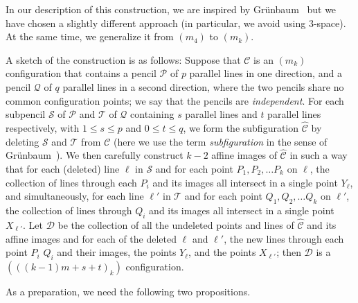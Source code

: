 \documentclass[reqno,12pt]{amsart}
\theoremstyle{plain}
\theoremstyle{definition}
\theoremstyle{remark}
\newcommand{\mc}[1]{\mathcal{#1}}
\begin{document}
In our description of this construction, we are inspired by Gr\"unbaum~\cite[\S 3.3, pp. 177--180]{Gru2009b} but we have chosen 
a slightly different approach (in particular, we avoid using 3-space). At the same time, we generalize it from $(m_4)$ to $(m_k)$.

A sketch of the construction is as follows: Suppose that $\mc{C}$ is an $(m_{k})$ configuration that contains a pencil $\mc{P}$ of 
$p$ parallel lines in one direction, and a pencil $\mc{Q}$ of $q$ parallel lines in a second direction, where the two pencils share 
no common configuration points; we say that the pencils are \emph{independent}. For each subpencil $\mc S$ of $\mc P$  and 
$\mc{T}$ of $\mc{Q}$ containing $s$ parallel lines and $t$ parallel lines respectively, with $1 \leq s \leq p$ and $0 \leq t \leq q$, 
we form the subfiguration $\hat{\mc C}$ by deleting $\mc S$ and $\mc T$ from $\mc C$ (here we use the term \emph{subfiguration} 
in the sense of Gr\"unbaum~\cite{Gru2009b}). We then carefully construct $k-2$ affine images of $\hat{\mc C}$ in such a way that 
for each (deleted) line $\ell$ in $\mc S$ and for each point $P_{1}, P_{2}, \ldots P_{k}$ on $\ell$, the collection of lines through each 
$P_{i}$ and its images all intersect in a single point $Y_{\ell}$, and simultaneously, for each line $\ell'$ in $\mc T$ and for each point 
$Q_{1}, Q_{2}, \ldots Q_{k}$ on $\ell'$, the collection of lines through $Q_{i}$ and its images all intersect in a single point $X_{\ell'}$. 
Let $\mc D$ be the collection of all the undeleted points and lines of $\hat{\mc{C}}$ and its affine images and for each of the deleted 
$\ell$ and $\ell'$, the new lines through each point $P_{i}$ $Q_{i}$ and their images, the points $Y_{\ell}$, and the points $X_{\ell'}$; 
then $\mc{D}$ is a $( ((k-1)m + s+t)_{k})$ configuration. 

As a preparation, we need the following two propositions.
\end{document}
